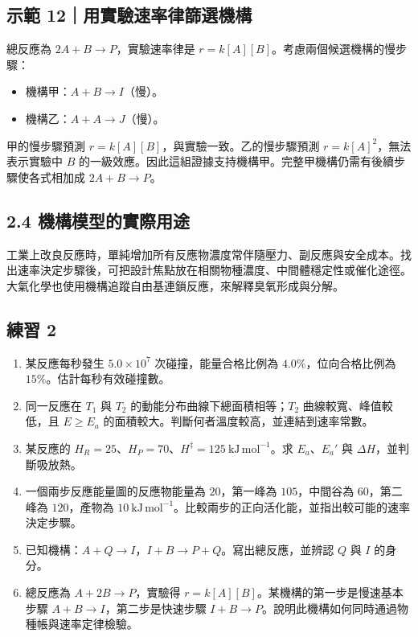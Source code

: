 \documentclass[11pt,a4paper]{article}
\providecommand{\tightlist}{%
  \setlength{\itemsep}{0pt}\setlength{\parskip}{0pt}}
\begin{document}
\begin{HandoutWorkedExample}

\subsection{示範 12｜用實驗速率律篩選機構}\label{ux793aux7bc4-12ux7528ux5be6ux9a57ux901fux7387ux5f8bux7be9ux9078ux6a5fux69cb}

總反應為 \(2A+B\rightarrow P\)，實驗速率律是 \(r=k[A][B]\)。考慮兩個候選機構的慢步驟：

\begin{itemize}
\tightlist
\item
  機構甲：\(A+B\rightarrow I\)（慢）。
\item
  機構乙：\(A+A\rightarrow J\)（慢）。
\end{itemize}

甲的慢步驟預測 \(r=k[A][B]\)，與實驗一致。乙的慢步驟預測 \(r=k[A]^2\)，無法表示實驗中 \(B\) 的一級效應。因此這組證據支持機構甲。完整甲機構仍需有後續步驟使各式相加成 \(2A+B\rightarrow P\)。

\end{HandoutWorkedExample}

\subsection{2.4 機構模型的實際用途}\label{ux6a5fux69cbux6a21ux578bux7684ux5be6ux969bux7528ux9014}

工業上改良反應時，單純增加所有反應物濃度常伴隨壓力、副反應與安全成本。找出速率決定步驟後，可把設計焦點放在相關物種濃度、中間體穩定性或催化途徑。大氣化學也使用機構追蹤自由基連鎖反應，來解釋臭氧形成與分解。

\subsection{練習 2}\label{ux7df4ux7fd2-2}

\begin{enumerate}
\def\labelenumi{\arabic{enumi}.}
\tightlist
\item
  某反應每秒發生 \(5.0\times10^7\) 次碰撞，能量合格比例為 \(4.0\%\)，位向合格比例為 \(15\%\)。估計每秒有效碰撞數。
\item
  同一反應在 \(T_1\) 與 \(T_2\) 的動能分布曲線下總面積相等；\(T_2\) 曲線較寬、峰值較低，且 \(E\ge E_a\) 的面積較大。判斷何者溫度較高，並連結到速率常數。
\item
  某反應的 \(H_R=25\)、\(H_P=70\)、\(H^{\ddagger}=125\ \mathrm{kJ\,mol^{-1}}\)。求 \(E_a\)、\(E_a'\) 與 \(\Delta H\)，並判斷吸放熱。
\item
  一個兩步反應能量圖的反應物能量為 \(20\)，第一峰為 \(105\)，中間谷為 \(60\)，第二峰為 \(120\)，產物為 \(10\ \mathrm{kJ\,mol^{-1}}\)。比較兩步的正向活化能，並指出較可能的速率決定步驟。
\item
  已知機構：\(A+Q\rightarrow I\)，\(I+B\rightarrow P+Q\)。寫出總反應，並辨認 \(Q\) 與 \(I\) 的身分。
\item
  總反應為 \(A+2B\rightarrow P\)，實驗得 \(r=k[A][B]\)。某機構的第一步是慢速基本步驟 \(A+B\rightarrow I\)，第二步是快速步驟 \(I+B\rightarrow P\)。說明此機構如何同時通過物種帳與速率定律檢驗。
\end{enumerate}
\end{document}
